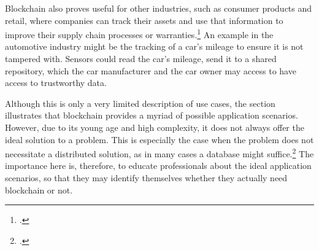 Blockchain also proves useful for other industries, such as consumer products and retail, where companies can track their assets and use that information to improve their supply chain processes or warranties.\footcite[Cf.][p.31]{GOV.2016} An example in the automotive industry might be the tracking of a car's mileage to ensure it is not tampered with. Sensors could read the car's mileage, send it to a shared repository, which the car manufacturer and the car owner may access to have access to trustworthy data. %

Although this is only a very limited description of use cases, the section illustrates that blockchain provides a myriad of possible application scenarios. However, due to its young age and high complexity, it does not always offer the ideal solution to a problem. This is especially the case when the problem does not necessitate a distributed solution, as in many cases a database might suffice.\footcites[Cf.][P152, P154]{BerndKammholz_Interview}[cf.][P23]{DanielKaltenbach_Interview} The importance here is, therefore, to educate professionals about the ideal application scenarios, so that they may identify themselves whether they actually need blockchain or not.
